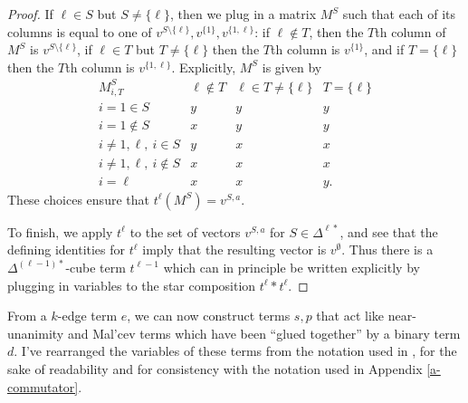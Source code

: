 \documentclass[letterpaper,11pt]{article}
\begin{document}
\begin{proof}
If $\ell \in S$ but $S \ne \{\ell\}$, then we plug in a matrix $M^S$ such that each of its columns is equal to one of $v^{S\setminus \{\ell\}}, v^{\{1\}}, v^{\{1,\ell\}}$: if $\ell \not\in T$, then the $T$th column of $M^S$ is $v^{S\setminus \{\ell\}}$, if $\ell \in T$ but $T \ne \{\ell\}$ then the $T$th column is $v^{\{1\}}$, and if $T = \{\ell\}$ then the $T$th column is $v^{\{1,\ell\}}$. Explicitly, $M^S$ is given by
\[
\begin{array}{c|ccc} M^S_{i,T} & \ell \not\in T & \ell \in T \ne \{\ell\} & T = \{\ell\}\\ \hline i = 1 \in S & y & y & y \\ i = 1 \not\in S & x & y & y \\ i \ne 1,\ell,\ i \in S & y & x & x\\ i \ne 1,\ell,\ i \not\in S & x & x & x\\ i = \ell & x & x & y.\end{array}
\]
These choices ensure that $t^\ell(M^S) = v^{S,a}$.%

To finish, we apply $t^\ell$ to the set of vectors $v^{S,a}$ for $S \in \Delta^{\ell *}$, and see that the defining identities for $t^\ell$ imply that the resulting vector is $v^\emptyset$. Thus there is a $\Delta^{(\ell-1)*}$-cube term $t^{\ell-1}$ which can in principle be written explicitly by plugging in variables to the star composition $t^\ell * t^\ell$.
\end{proof}

From a $k$-edge term $e$, we can now construct terms $s,p$ that act like near-unanimity and Mal'cev terms which have been ``glued together'' by a binary term $d$. I've rearranged the variables of these terms from the notation used in \cite{few-subpowers}, for the sake of readability and for consistency with the notation used in Appendix \ref{a-commutator}.%
\end{document}
